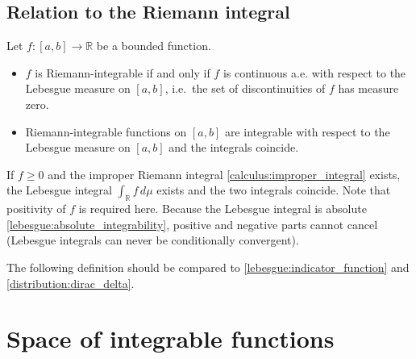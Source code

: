 \subsection{Relation to the Riemann integral}

    \begin{property}
        Let $f:[a,b]\rightarrow\mathbb{R}$ be a bounded function.
        \begin{itemize}
            \item $f$ is Riemann-integrable if and only if $f$ is continuous a.e. with respect to the Lebesgue measure on $[a,b]$, i.e.~the set of discontinuities of $f$ has measure zero.
            \item Riemann-integrable functions on $[a,b]$ are integrable with respect to the Lebesgue measure on $[a,b]$ and the integrals coincide.
        \end{itemize}
    \end{property}

    \begin{property}
        If $f\geq0$ and the improper Riemann integral \ref{calculus:improper_integral} exists, the Lebesgue integral $\int_\mathbb{R}f\,d\mu$ exists and the two integrals coincide. Note that positivity of $f$ is required here. Because the Lebesgue integral is absolute \ref{lebesgue:absolute_integrability}, positive and negative parts cannot cancel (Lebesgue integrals can never be conditionally convergent).
    \end{property}

    The following definition should be compared to \ref{lebesgue:indicator_function} and \ref{distribution:dirac_delta}.

\section{Space of integrable functions}
